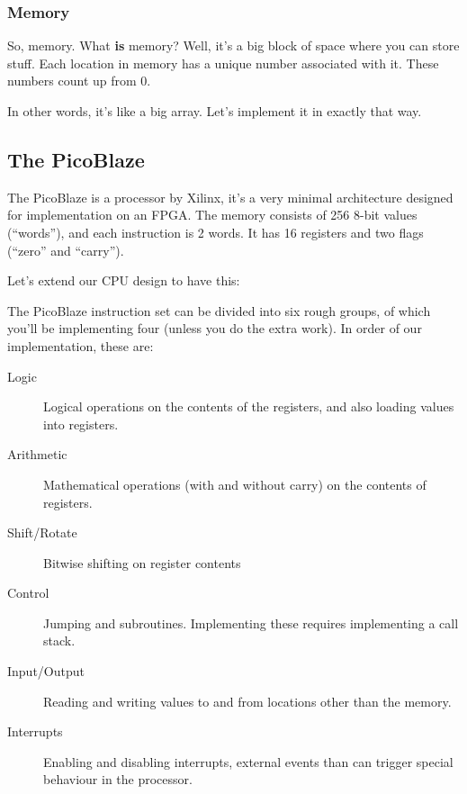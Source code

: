\documentclass[12pt,a4paper]{article}
\begin{document}


\pagebreak
\subsubsection{Memory}

So, memory. What \textbf{is} memory? Well, it's a big block of space
where you can store stuff. Each location in memory has a unique number
associated with it. These numbers count up from 0.

In other words, it's like a big array. Let's implement it in exactly
that way.



\pagebreak
\subsection{The PicoBlaze}

The PicoBlaze is a processor by Xilinx, it's a very minimal
architecture designed for implementation on an FPGA. The memory
consists of 256 8-bit values (``words''), and each instruction is 2
words. It has 16 registers and two flags (``zero'' and ``carry'').

Let's extend our CPU design to have this:



The PicoBlaze instruction set can be divided into six rough groups, of
which you'll be implementing four (unless you do the extra
work). In order of our implementation, these are:

\begin{description}
  \item[Logic] Logical operations on the contents of the registers,
    and also loading values into registers.

  \item[Arithmetic] Mathematical operations (with and without carry)
    on the contents of registers.

  \item[Shift/Rotate] Bitwise shifting on register contents

  \item[Control] Jumping and subroutines. Implementing these
    requires implementing a call stack.

  \item[Input/Output] Reading and writing values to and from locations
    other than the memory.

  \item[Interrupts] Enabling and disabling interrupts, external events
    than can trigger special behaviour in the processor.
\end{description}
\end{document}
